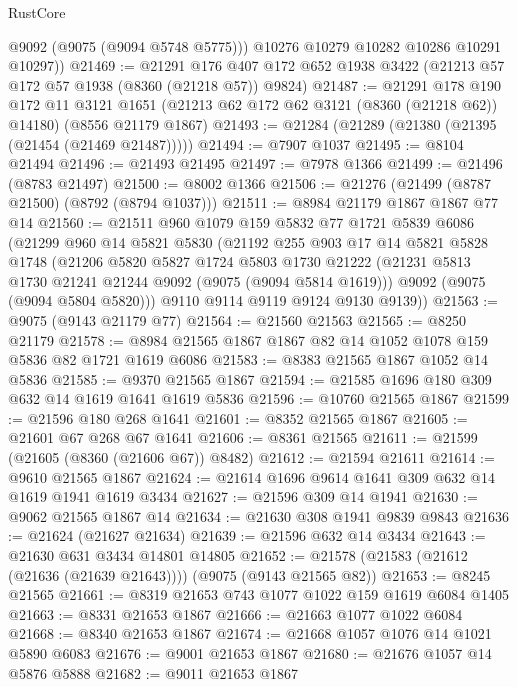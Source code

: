 \begin{lexlean}{RustCore}
\begin{coremodule}
          @9092
          (@9075 (@9094 @5748 @5775)))
        @10276
        @10279
        @10282
        @10286
        @10291
        @10297))
@21469 := @21291
    @176
    @407
    @172
    @652
    @1938
    @3422
    (@21213 @57 @172 @57 @1938 (@8360 (@21218 @57)) @9824)
@21487 := @21291
    @178
    @190
    @172
    @11
    @3121
    @1651
    (@21213 @62 @172 @62 @3121 (@8360 (@21218 @62)) @14180)
    (@8556 @21179 @1867)
@21493 := @21284 (@21289 (@21380 (@21395 (@21454 (@21469 @21487)))))
@21494 := @7907 @1037
@21495 := @8104 @21494
@21496 := @21493 @21495
@21497 := @7978 @1366
@21499 := @21496 (@8783 @21497)
@21500 := @8002 @1366
@21506 := @21276 (@21499 (@8787 @21500) (@8792 (@8794 @1037)))
@21511 := @8984 @21179 @1867 @1867 @77 @14
@21560 := @21511
    @960
    @1079
    @159
    @5832
    @77
    @1721
    @5839
    @6086
    (@21299
      @960
      @14
      @5821
      @5830
      (@21192
        @255
        @903
        @17
        @14
        @5821
        @5828
        @1748
        (@21206
          @5820
          @5827
          @1724
          @5803
          @1730
          @21222
          (@21231 @5813 @1730 @21241 @21244 @9092 (@9075 (@9094 @5814 @1619)))
          @9092
          (@9075 (@9094 @5804 @5820)))
        @9110
        @9114
        @9119
        @9124
        @9130
        @9139))
@21563 := @9075 (@9143 @21179 @77)
@21564 := @21560 @21563
@21565 := @8250 @21179
@21578 := @8984 @21565 @1867 @1867 @82 @14 @1052 @1078 @159 @5836 @82 @1721 @1619 @6086
@21583 := @8383 @21565 @1867 @1052 @14 @5836
@21585 := @9370 @21565 @1867
@21594 := @21585 @1696 @180 @309 @632 @14 @1619 @1641 @1619 @5836
@21596 := @10760 @21565 @1867
@21599 := @21596 @180 @268 @1641
@21601 := @8352 @21565 @1867
@21605 := @21601 @67 @268 @67 @1641
@21606 := @8361 @21565
@21611 := @21599 (@21605 (@8360 (@21606 @67)) @8482)
@21612 := @21594 @21611
@21614 := @9610 @21565 @1867
@21624 := @21614 @1696 @9614 @1641 @309 @632 @14 @1619 @1941 @1619 @3434
@21627 := @21596 @309 @14 @1941
@21630 := @9062 @21565 @1867 @14
@21634 := @21630 @308 @1941 @9839 @9843
@21636 := @21624 (@21627 @21634)
@21639 := @21596 @632 @14 @3434
@21643 := @21630 @631 @3434 @14801 @14805
@21652 := @21578 (@21583 (@21612 (@21636 (@21639 @21643)))) (@9075 (@9143 @21565 @82))
@21653 := @8245 @21565
@21661 := @8319 @21653 @743 @1077 @1022 @159 @1619 @6084 @1405
@21663 := @8331 @21653 @1867
@21666 := @21663 @1077 @1022 @6084
@21668 := @8340 @21653 @1867
@21674 := @21668 @1057 @1076 @14 @1021 @5890 @6083
@21676 := @9001 @21653 @1867
@21680 := @21676 @1057 @14 @5876 @5888
@21682 := @9011 @21653 @1867

\end{coremodule}
\end{lexlean}
